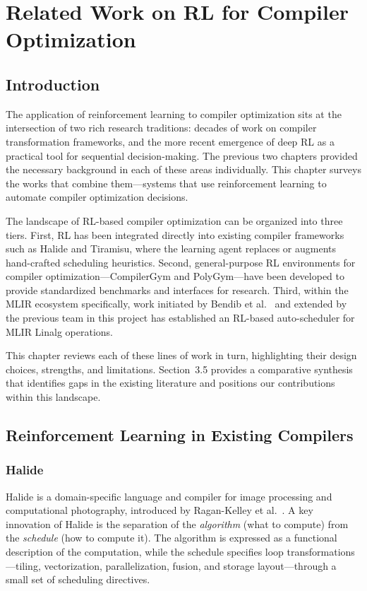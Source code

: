 \chapter{Related Work on RL for Compiler Optimization}
\label{ch:related-work}

\section{Introduction}

The application of reinforcement learning to compiler optimization sits at the intersection of two rich research traditions: decades of work on compiler transformation frameworks, and the more recent emergence of deep RL as a practical tool for sequential decision-making. The previous two chapters provided the necessary background in each of these areas individually. This chapter surveys the works that combine them—systems that use reinforcement learning to automate compiler optimization decisions.

The landscape of RL-based compiler optimization can be organized into three tiers. First, RL has been integrated directly into existing compiler frameworks such as Halide and Tiramisu, where the learning agent replaces or augments hand-crafted scheduling heuristics. Second, general-purpose RL environments for compiler optimization—CompilerGym and PolyGym—have been developed to provide standardized benchmarks and interfaces for research. Third, within the MLIR ecosystem specifically, work initiated by Bendib et al.~\cite{bendib2024reinforcement} and extended by the previous team in this project has established an RL-based auto-scheduler for MLIR Linalg operations.

This chapter reviews each of these lines of work in turn, highlighting their design choices, strengths, and limitations. Section~3.5 provides a comparative synthesis that identifies gaps in the existing literature and positions our contributions within this landscape.

\section{Reinforcement Learning in Existing Compilers}

\subsection{Halide}

Halide is a domain-specific language and compiler for image processing and computational photography, introduced by Ragan-Kelley et al.~\cite{ragan2013halide}. A key innovation of Halide is the separation of the \textit{algorithm} (what to compute) from the \textit{schedule} (how to compute it). The algorithm is expressed as a functional description of the computation, while the schedule specifies loop transformations—tiling, vectorization, parallelization, fusion, and storage layout—through a small set of scheduling directives.

